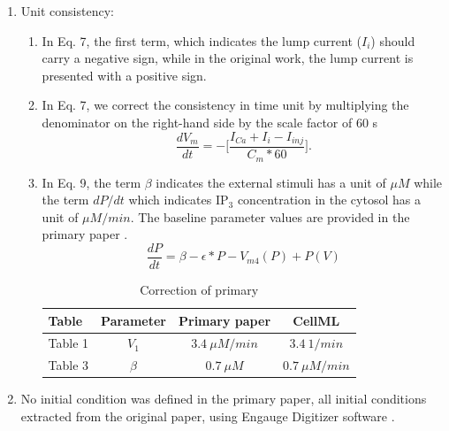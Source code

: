 \documentclass[fleqn,10pt]{physiome}
\begin{document}
\begin{enumerate}

\item Unit consistency:
\begin{enumerate}
\item In Eq. 7, the first term, which indicates the lump current ($I_{i}$) should carry a negative sign, while in the original work, the lump current is presented with a positive sign. 

\item In Eq. 7, we correct the consistency in time unit by multiplying the denominator on the right-hand side by the scale factor of 60 s
\begin{equation*}
\frac{dV_{m}}{dt} = - \Big[\frac{I_{Ca}+ I_{i}-I_{inj}}{C_{m}*60}\Big].
\end{equation*}
\item In Eq. 9,  the term $\beta$ indicates the external stimuli has a unit of $\mu M $ while the term $dP /dt$ which indicates IP$_{3}$ concentration in the cytosol has a unit of $\mu M /min$.
The baseline parameter values are provided in the primary paper \citet{imtiaz2002theoretical}.
\begin{equation*}
  \frac{dP}{dt} = \beta - \epsilon *  P  - V_{m4}(P) + P (V)
\end{equation*}



\begin{table}
\centering
\caption{Correction of primary \cite[Tables 1,2 \& 3]{imtiaz2002theoretical}}
\label{tab:Inconsistency}

\begin{tabular}{lccc}

\toprule
Table & Parameter & Primary paper & CellML \\
\midrule

Table 1 & $ V_{1}$ & $3.4 \ \mu M /min$ & $3.4\ 1 /min$ \\
Table 3 & $\beta$ & $0.7 \ \mu M $ &  $0.7 \ \mu M /min$  \\

\bottomrule
\end{tabular}
\end{table}
 \end{enumerate}

\item No initial condition was defined in the primary paper, all initial conditions extracted from the original paper, using Engauge Digitizer software \citep{mark_mitchell_2020_3941227}.


\end{enumerate}
\end{document}
